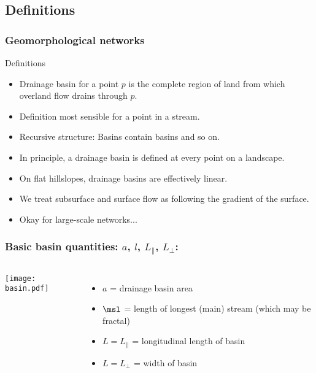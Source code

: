 \subsection{Definitions}

\begin{frame}[label=]
  \frametitle{Geomorphological networks}

  \begin{block}{Definitions}
    \begin{itemize}
    \item<1-> \alert{Drainage basin} for a point $p$ is the 
      complete region of land from which overland flow drains through $p$.
    \item<2-> Definition most sensible for a point in a stream.
    \item<3-> \alert{Recursive structure:} Basins contain basins and so on.
    \item<4-> In principle, a drainage basin is defined at every point
      on a landscape.
    \item<5-> On flat hillslopes, drainage basins are effectively linear.
    \item<6-> We treat subsurface and surface flow as following
      the gradient of the surface.
    \item<7-> Okay for large-scale networks...
    \end{itemize}
  \end{block}
\end{frame}

\begin{frame}[label=]
  \frametitle{Basic basin quantities: $a$, $l$, $L_\parallel$, $L_\perp$:}

  \begin{columns}
    \texttt{[image: basin.pdf]}
    \begin{itemize}
    \item<2-> 
      \alert{$a$} = drainage basin area
    \item<3-> 
      \alert{$\msl$} = length of longest (main) stream 
      (which may be fractal)
    \item<4-> 
      \alert{$L = L_\parallel$} = longitudinal length of basin
    \item<5-> 
      \alert{$L = L_\perp$} = width of basin
    \end{itemize}

  \end{columns}
\end{frame}

